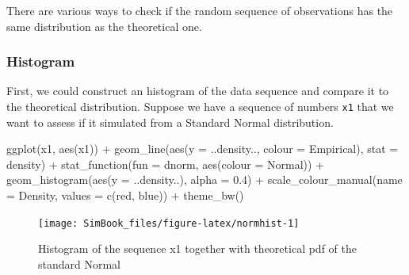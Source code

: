 \documentclass[
]{book}
\newenvironment{Shaded}{\begin{snugshade}}{\end{snugshade}}
\newcommand{\AttributeTok}[1]{\textcolor[rgb]{0.77,0.63,0.00}{#1}}
\newcommand{\FloatTok}[1]{\textcolor[rgb]{0.00,0.00,0.81}{#1}}
\newcommand{\FunctionTok}[1]{\textcolor[rgb]{0.00,0.00,0.00}{#1}}
\newcommand{\NormalTok}[1]{#1}
\newcommand{\SpecialCharTok}[1]{\textcolor[rgb]{0.00,0.00,0.00}{#1}}
\newcommand{\StringTok}[1]{\textcolor[rgb]{0.31,0.60,0.02}{#1}}
\begin{document}
There are various ways to check if the random sequence of observations has the same distribution as the theoretical one.

\hypertarget{histogram}{%
\subsubsection{Histogram}\label{histogram}}

First, we could construct an histogram of the data sequence and compare it to the theoretical distribution. Suppose we have a sequence of numbers \texttt{x1} that we want to assess if it simulated from a Standard Normal distribution.

\begin{Shaded}
\begin{Highlighting}[]
\FunctionTok{ggplot}\NormalTok{(x1, }\FunctionTok{aes}\NormalTok{(x1)) }\SpecialCharTok{+}
   \FunctionTok{geom\_line}\NormalTok{(}\FunctionTok{aes}\NormalTok{(}\AttributeTok{y =}\NormalTok{ ..density.., }\AttributeTok{colour =} \StringTok{\textquotesingle{}Empirical\textquotesingle{}}\NormalTok{), }\AttributeTok{stat =} \StringTok{\textquotesingle{}density\textquotesingle{}}\NormalTok{) }\SpecialCharTok{+}
   \FunctionTok{stat\_function}\NormalTok{(}\AttributeTok{fun =}\NormalTok{ dnorm, }\FunctionTok{aes}\NormalTok{(}\AttributeTok{colour =} \StringTok{\textquotesingle{}Normal\textquotesingle{}}\NormalTok{)) }\SpecialCharTok{+}      
   \FunctionTok{geom\_histogram}\NormalTok{(}\FunctionTok{aes}\NormalTok{(}\AttributeTok{y =}\NormalTok{ ..density..), }\AttributeTok{alpha =} \FloatTok{0.4}\NormalTok{) }\SpecialCharTok{+}      
   \FunctionTok{scale\_colour\_manual}\NormalTok{(}\AttributeTok{name =} \StringTok{\textquotesingle{}Density\textquotesingle{}}\NormalTok{, }\AttributeTok{values =} \FunctionTok{c}\NormalTok{(}\StringTok{\textquotesingle{}red\textquotesingle{}}\NormalTok{, }\StringTok{\textquotesingle{}blue\textquotesingle{}}\NormalTok{)) }\SpecialCharTok{+}
   \FunctionTok{theme\_bw}\NormalTok{()}
\end{Highlighting}
\end{Shaded}

\begin{figure}

{\centering \texttt{[image: SimBook\_files/figure-latex/normhist-1]} 

}

\caption{Histogram of the sequence x1 together with theoretical pdf of the standard Normal}\label{fig:normhist}
\end{figure}
\end{document}
